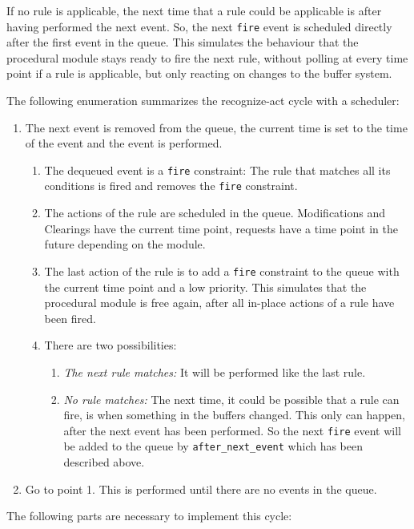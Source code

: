 If no rule is applicable, the next time that a rule could be applicable is after having performed the next event. So, the next \lstinline|fire| event is scheduled directly after the first event in the queue. This simulates the behaviour that the procedural module stays ready to fire the next rule, without polling at every time point if a rule is applicable, but only reacting on changes to the buffer system. 


The following enumeration summarizes the recognize-act cycle with a scheduler:

\begin{enumerate}
 \item The next event is removed from the queue, the current time is set to the time of the event and the event is performed.
 \begin{enumerate}
 \item The dequeued event is a \lstinline|fire| constraint: The rule that matches all its conditions is fired and removes the \lstinline|fire| constraint.
 \item The actions of the rule are scheduled in the queue. Modifications and Clearings have the current time point, requests have a time point in the future depending on the module.
 \item The last action of the rule is to add a \lstinline|fire| constraint to the queue with the current time point and a low priority. This simulates that the procedural module is free again, after all in-place actions of a rule have been fired.
 \item There are two possibilities:
 \begin{enumerate}
  \item \emph{The next rule matches:} It will be performed like the last rule.
  \item \emph{No rule matches:} The next time, it could be possible that a rule can fire, is when something in the buffers changed. This only can happen, after the next event has been performed. So the next \lstinline|fire| event will be added to the queue by \lstinline|after_next_event| which has been described above.
 \end{enumerate}
  \end{enumerate}
 \item Go to point 1. This is performed until there are no events in the queue.
\end{enumerate}


The following parts are necessary to implement this cycle:

